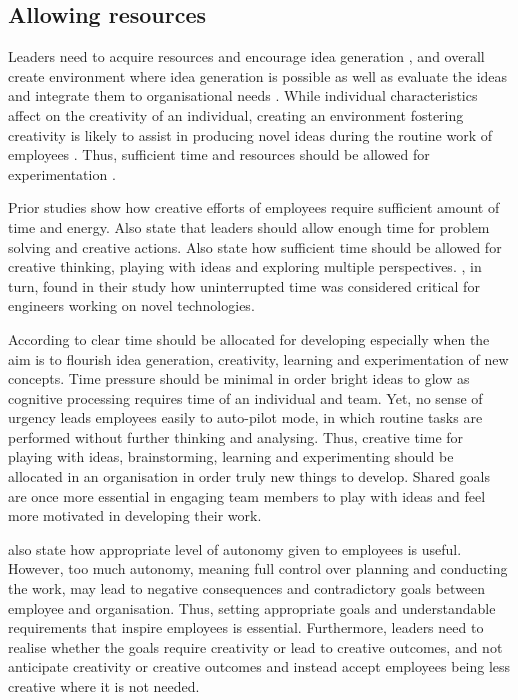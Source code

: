 \subsection{Allowing resources}

Leaders need to acquire resources and encourage idea generation \citep{mcgourty1996managing}, and overall create environment where idea generation is possible \citep{andrews1970social} as well as evaluate the ideas and integrate them to organisational needs \citep{mumford2002leading}. While individual characteristics affect on the creativity of an individual, creating an environment fostering creativity is likely to assist in producing novel ideas during the routine work of employees \citep{amabile1996assessing}. Thus, sufficient time and resources should be allowed for experimentation \citet{amabile2008creativity,katz1985project}. 

Prior studies show how creative efforts of employees require sufficient amount of time and energy\citep{gardner1988creativity,getzels1975problem}. Also \citet{redmond1993putting} state that leaders should allow enough time for problem solving and creative actions. Also \citet{amabile1987creativity} state how sufficient time should be allowed for creative thinking, playing with ideas and exploring multiple perspectives. \citet{katz1985project}, in turn, found in their study how uninterrupted time was considered critical for engineers working on novel technologies. 

According to \citet{amabile2002creativity} clear time should be allocated for developing especially when the aim is to flourish idea generation, creativity, learning and experimentation of new concepts. Time pressure should be minimal in order bright ideas to glow as cognitive processing requires time of an individual and team. Yet, no sense of urgency leads employees easily to auto-pilot mode, in which routine tasks are performed without further thinking and analysing. Thus, creative time for playing with ideas, brainstorming, learning and experimenting should be allocated in an organisation in order truly new things to develop. Shared goals are once more essential in engaging team members to play with ideas and feel more motivated in developing their work. \citep{amabile2002creativity}

\citet{shalley2004leaders} also state how appropriate level of autonomy given to employees is useful. However, too much autonomy, meaning full control over planning and conducting the work, may lead to negative consequences and contradictory goals between employee and organisation. Thus, setting appropriate goals and understandable requirements that inspire employees is essential. Furthermore, leaders need to realise whether the goals require creativity or lead to creative outcomes, and not anticipate creativity or creative outcomes and instead accept employees being less creative where it is not needed. \citep{shalley2004leaders} 

